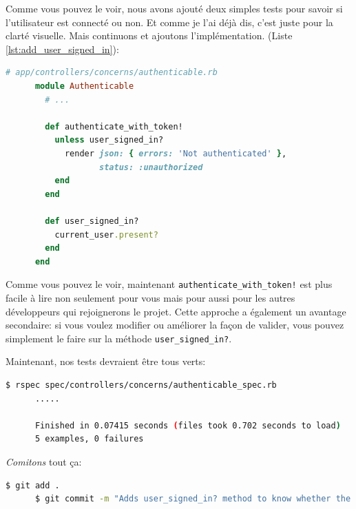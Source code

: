 \documentclass[]{report}
\begin{document}
    Comme vous pouvez le voir, nous avons ajouté deux simples tests pour savoir si l'utilisateur est connecté ou non. Et comme je l'ai déjà dis, c'est juste pour la clarté visuelle. Mais continuons et ajoutons l'implémentation. (Liste \ref{lst:add_user_signed_in}):

    \begin{scriptsize}
      \begin{lstlisting}[language=ruby, caption={Implémetation de  user\_signed\_in?}, label={lst:add_user_signed_in}]
      # app/controllers/concerns/authenticable.rb
      module Authenticable
        # ...

        def authenticate_with_token!
          unless user_signed_in?
            render json: { errors: 'Not authenticated' },
                   status: :unauthorized
          end
        end

        def user_signed_in?
          current_user.present?
        end
      end
      \end{lstlisting}
    \end{scriptsize}

    Comme vous pouvez le voir, maintenant \verb|authenticate_with_token!| est plus facile à lire non seulement pour vous mais pour aussi pour les autres développeurs qui rejoignerons le projet. Cette approche a également un avantage secondaire: si vous voulez modifier ou améliorer la façon de valider, vous pouvez simplement le faire sur la méthode \verb|user_signed_in?|.

    Maintenant, nos tests devraient être tous verts:

    \begin{scriptsize}
      \begin{lstlisting}[language=bash]
      $ rspec spec/controllers/concerns/authenticable_spec.rb
      .....

      Finished in 0.07415 seconds (files took 0.702 seconds to load)
      5 examples, 0 failures
      \end{lstlisting}
    \end{scriptsize}

    \textit{Comitons} tout ça:

    \begin{scriptsize}
      \begin{lstlisting}[language=bash]
      $ git add .
      $ git commit -m "Adds user_signed_in? method to know whether the user is logged in or not"
      \end{lstlisting}
    \end{scriptsize}
\end{document}
